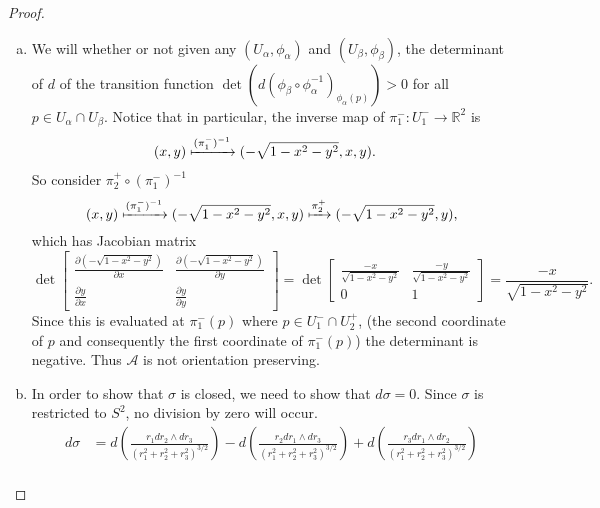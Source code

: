 \documentclass{article}
\begin{document}
\begin{proof} \text{} \\
  \begin{enumerate}[(a)]
    \item We will whether or not given any $(U_\alpha, \phi_\alpha)$
      and $(U_\beta, \phi_\beta)$, the determinant of $d$ of the transition
      function
      $\det(d(\phi_\beta \circ \phi_\alpha^{-1})_{\phi_\alpha(p)}) > 0$ for all
      $p \in U_\alpha \cap U_\beta$.
      Notice that in particular, the inverse map of
      $\pi_1^-\colon U_1^- \rightarrow \mathbb{R}^2$ is \begin{align*}
        (x, y) &\xmapsto{(\pi_1^-)^{-1}} (-\sqrt{1-x^2-y^2}, x, y).
      \end{align*}
      So consider $\pi_2^+ \circ (\pi_1^-)^{-1}$ \[
        (x, y) \xmapsto{(\pi_1^-)^{-1}} (-\sqrt{1-x^2-y^2}, x, y) \xmapsto{\pi_2^+} (-\sqrt{1-x^2-y^2}, y),
      \] which has Jacobian matrix \[
        \det\begin{bmatrix}
          \frac{\displaystyle\partial(-\sqrt{1-x^2-y^2})}{\displaystyle\partial x} & \frac{\displaystyle\partial(-\sqrt{1-x^2-y^2})}{\displaystyle\partial y} \\[10pt]
          \frac{\displaystyle\partial y}{\displaystyle\partial x} & \frac{\displaystyle\partial y}{\displaystyle\partial y}
        \end{bmatrix} =
        \det\begin{bmatrix}
          \frac{\displaystyle-x}{\displaystyle\sqrt{1-x^2-y^2}} & \frac{\displaystyle-y}{\displaystyle\sqrt{1-x^2-y^2}} \\[10pt]
          0 & 1
        \end{bmatrix} = \frac{\displaystyle-x}{\displaystyle\sqrt{1-x^2-y^2}}.
      \] Since this is evaluated at $\pi_1^-(p)$ where $p \in U_1^- \cap U_2^+$,
      (the second coordinate of $p$ and consequently the first coordinate of
      $\pi_1^-(p)$) the determinant is negative. Thus $\mathcal{A}$ is not orientation preserving.
    \item In order to show that $\sigma$ is closed, we need to show that
    $d\sigma = 0$. Since $\sigma$ is restricted to $S^2$, no division by zero will occur.
    \begin{align*}
      d\sigma &= d\left(\frac{r_1dr_2 \wedge dr_3}{(r_1^2 + r_2^2 + r_3^2)^{3/2}}\right)
      - d\left(\frac{r_2dr_1 \wedge dr_3}{(r_1^2 + r_2^2 + r_3^2)^{3/2}}\right)
      + d\left(\frac{r_3 dr_1\wedge dr_2}{(r_1^2 + r_2^2 + r_3^2)^{3/2}}\right)\\

\end{align*}
\end{enumerate}
\end{proof}
\end{document}
